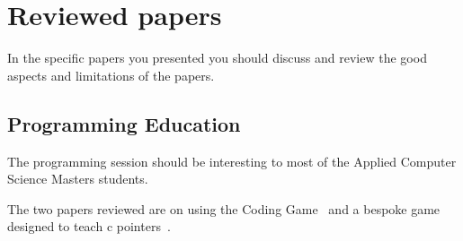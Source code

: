 \section{Reviewed papers}
In the specific papers you presented you should discuss and review the good aspects and limitations of the papers.

\subsection{Programming Education}
The programming session should be interesting to most of the Applied Computer Science Masters students. 

The two papers reviewed are on using the Coding Game~\cite{butt2016} and a bespoke game designed to teach c pointers~\cite{Yassine2017}. 
